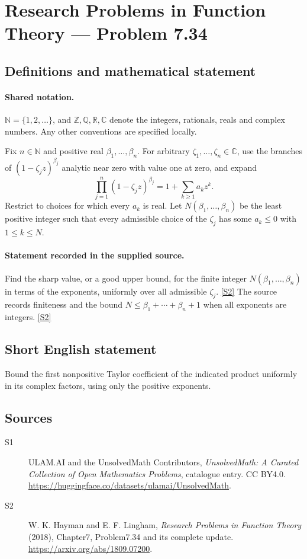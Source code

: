 \documentclass[11pt]{article}
\newcommand{\sref}[2]{\hyperlink{source:#1:#2}{[S#2]}}
\begin{document}
\section{Research Problems in Function Theory — Problem 7.34}\label{statement}

\subsection{Definitions and mathematical statement}

\paragraph{Shared notation.}$\mathbb N=\{1,2,\ldots\}$, and $\mathbb Z,\mathbb Q,\mathbb R,\mathbb C$ denote the integers, rationals, reals and complex numbers. Any other conventions are specified locally.


Fix $n\in\mathbb N$ and positive real $\beta_1,\ldots,\beta_n$. For arbitrary $\zeta_1,\ldots,\zeta_n\in\mathbb C$, use the branches of $(1-\zeta_jz)^{\beta_j}$ analytic near zero with value one at zero, and expand
\[\prod_{j=1}^n(1-\zeta_jz)^{\beta_j}=1+\sum_{k\ge1}a_kz^k.\]
Restrict to choices for which every $a_k$ is real. Let $N(\beta_1,\ldots,\beta_n)$ be the least positive integer such that every admissible choice of the $\zeta_j$ has some $a_k\le0$ with $1\le k\le N$.

\paragraph{Statement recorded in the supplied source.}
Find the sharp value, or a good upper bound, for the finite integer $N(\beta_1,\ldots,\beta_n)$ in terms of the exponents, uniformly over all admissible $\zeta_j$. \sref{statement}{2}
The source records finiteness and the bound $N\le\beta_1+\cdots+\beta_n+1$ when all exponents are integers. \sref{statement}{2}
\subsection{Short English statement}
Bound the first nonpositive Taylor coefficient of the indicated product uniformly in its complex factors, using only the positive exponents.
\subsection{Sources}
\begin{description}
\item[\hypertarget{source:statement:1}{S1}] ULAM.AI and the UnsolvedMath Contributors, \emph{UnsolvedMath: A Curated Collection of Open Mathematics Problems}, catalogue entry. CC BY4.0. \url{https://huggingface.co/datasets/ulamai/UnsolvedMath}.
\item[\hypertarget{source:statement:2}{S2}] W. K. Hayman and E. F. Lingham, \emph{Research Problems in Function Theory} (2018), Chapter7, Problem7.34 and its complete update. \url{https://arxiv.org/abs/1809.07200}.
\end{description}
\label{end:statement}
\end{document}
